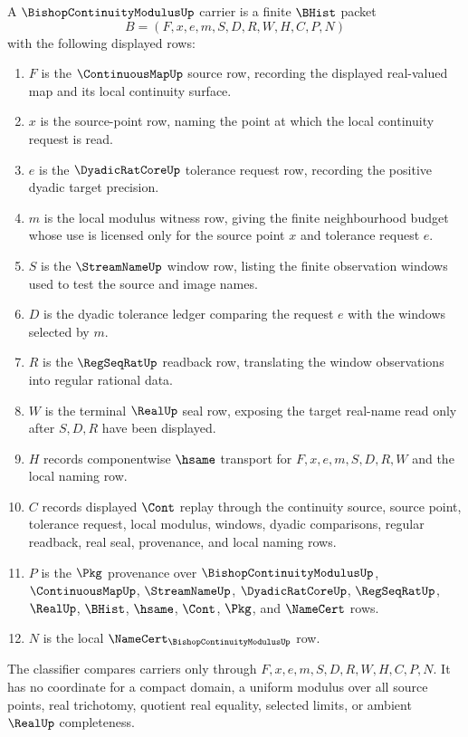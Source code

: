 \begin{definition}
\label{def:bishop-continuity-modulus-carrier}
A $\BishopContinuityModulusUp$ carrier is a finite $\BHist$ packet
$$
B=(F,x,e,m,S,D,R,W,H,C,P,N)
$$
with the following displayed rows:
\begin{enumerate}
\item $F$ is the $\ContinuousMapUp$ source row, recording the displayed real-valued map and its local continuity surface.
\item $x$ is the source-point row, naming the point at which the local continuity request is read.
\item $e$ is the $\DyadicRatCoreUp$ tolerance request row, recording the positive dyadic target precision.
\item $m$ is the local modulus witness row, giving the finite neighbourhood budget whose use is licensed only for the source point $x$ and tolerance request $e$.
\item $S$ is the $\StreamNameUp$ window row, listing the finite observation windows used to test the source and image names.
\item $D$ is the dyadic tolerance ledger comparing the request $e$ with the windows selected by $m$.
\item $R$ is the $\RegSeqRatUp$ readback row, translating the window observations into regular rational data.
\item $W$ is the terminal $\RealUp$ seal row, exposing the target real-name read only after $S,D,R$ have been displayed.
\item $H$ records componentwise $\hsame$ transport for $F,x,e,m,S,D,R,W$ and the local naming row.
\item $C$ records displayed $\Cont$ replay through the continuity source, source point, tolerance request, local modulus, windows, dyadic comparisons, regular readback, real seal, provenance, and local naming rows.
\item $P$ is the $\Pkg$ provenance over $\BishopContinuityModulusUp$, $\ContinuousMapUp$, $\StreamNameUp$, $\DyadicRatCoreUp$, $\RegSeqRatUp$, $\RealUp$, $\BHist$, $\hsame$, $\Cont$, $\Pkg$, and $\NameCert$ rows.
\item $N$ is the local $\NameCert_{\BishopContinuityModulusUp}$ row.
\end{enumerate}
The classifier compares carriers only through $F,x,e,m,S,D,R,W,H,C,P,N$. It has no coordinate for a compact domain, a uniform modulus over all source points, real trichotomy, quotient real equality, selected limits, or ambient $\RealUp$ completeness.
\end{definition}

